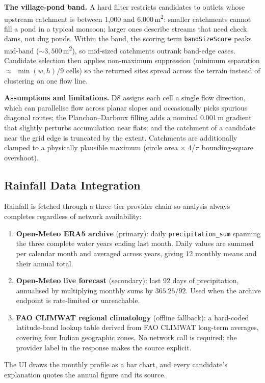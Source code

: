 \documentclass[manuscript,screen,review]{acmart}
\begin{document}
\textbf{The village-pond band.} A hard filter restricts candidates to
outlets whose upstream catchment is between 1{,}000 and 6{,}000\,m\textsuperscript{2}:
smaller catchments cannot fill a pond in a typical monsoon; larger ones
describe streams that need check dams, not dug ponds. Within the band, the
scoring term \texttt{bandSizeScore} peaks mid-band (${\sim}3{,}500$\,m\textsuperscript{2}),
so mid-sized catchments outrank band-edge cases. Candidate selection then
applies non-maximum suppression (minimum separation $\approx$
$\min(w,h)/9$ cells) so the returned sites spread across the terrain instead
of clustering on one flow line.

\textbf{Assumptions and limitations.} D8 assigns each cell a single flow
direction, which can parallelise flow across planar slopes and occasionally
picks spurious diagonal routes; the Planchon--Darboux filling adds a nominal
0.001\,m gradient that slightly perturbs accumulation near flats; and the
catchment of a candidate near the grid edge is truncated by the extent.
Catchments are additionally clamped to a physically plausible maximum
(circle area $\times$ 4/$\pi$ bounding-square overshoot).

\subsection{Rainfall Data Integration}
Rainfall is fetched through a three-tier provider chain so analysis always
completes regardless of network availability:
\begin{enumerate}
  \item \textbf{Open-Meteo ERA5 archive} (primary): daily
  \texttt{precipitation\_sum} spanning the three complete water years ending
  last month. Daily values are summed per calendar month and averaged across
  years, giving 12 monthly means and their annual total.
  \item \textbf{Open-Meteo live forecast} (secondary): last 92 days of
  precipitation, annualised by multiplying monthly sums by $365.25/92$.
  Used when the archive endpoint is rate-limited or unreachable.
  \item \textbf{FAO CLIMWAT regional climatology} (offline fallback): a
  hard-coded latitude-band lookup table derived from FAO CLIMWAT long-term
  averages, covering four Indian geographic zones. No network call is
  required; the provider label in the response makes the source explicit.
\end{enumerate}
The UI draws the monthly profile as a bar chart, and every candidate's
explanation quotes the annual figure and its source.
\end{document}
